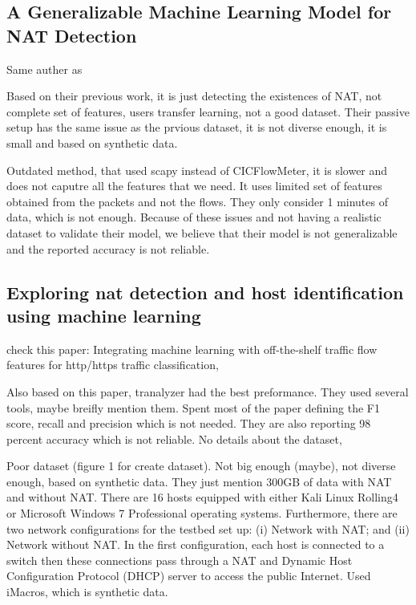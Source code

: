 \subsection{A Generalizable Machine Learning Model for NAT
Detection \cite{nassar2023generalizable}}
Same auther as \cite{nassar2021identifying}

Based on their previous work, it is just detecting the existences of NAT, not complete set of features, users transfer learning, not a good dataset. Their passive setup has the same issue as the prvious dataset, it is not diverse enough, it is small and based on synthetic data.

Outdated method, that used scapy instead of CICFlowMeter, it is slower and does not caputre all the features that we need. It uses limited set of features obtained from the packets and not the flows. They only consider 1 minutes of data, which is not enough. Because of these issues and not having a realistic dataset to validate their model, we believe that their model is not generalizable and the reported accuracy is not reliable.



\subsection{Exploring nat detection and host identification using machine learning \cite{khatouni2019exploring}}

check this paper: Integrating machine learning
with off-the-shelf traffic flow features for http/https traffic classification,

Also based on this paper, tranalyzer had the best preformance. They used several tools, maybe breifly mention them. Spent most of the paper defining the F1 score, recall and precision which is not needed. They are also reporting 98 percent accuracy which is not reliable. No details about the dataset, 

Poor dataset (figure 1 for create dataset). Not big enough (maybe), not diverse enough, based on synthetic data. They just mention 300GB of data with NAT and without NAT. 
There are 16 hosts equipped with either Kali Linux Rolling4 or Microsoft Windows 7 Professional operating systems. Furthermore, there are two network configurations for the testbed set up: (i) Network with NAT; and (ii) Network without NAT. In the first configuration, each host is connected to a switch then these connections pass through a NAT and Dynamic Host Configuration Protocol (DHCP) server to access the public Internet. Used iMacros, which is synthetic data. 

